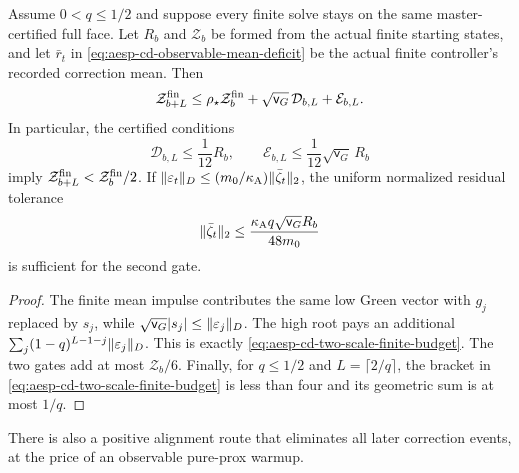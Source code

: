 \begin{corollary}
\label{cor:aesp-cd-finite-two-scale-window}
Assume $0<q\leq1/2$ and suppose every finite solve stays on the same
master-certified full face.  Let $R_b$ and $\mathcal Z_b$ be formed from the
actual finite starting states, and let $\bar r_t$ in
\cref{eq:aesp-cd-observable-mean-deficit} be the actual finite controller's
recorded correction mean.  Then
\begin{equation*}
 \mathcal Z_{b+L}^{\rm fin}
 \leq\rho_\star\mathcal Z_b^{\rm fin}
 +\sqrt{\mathsf v_G}\,\mathcal D_{b,L}
 +\mathcal E_{b,L}.
\end{equation*}
In particular, the certified conditions
\begin{equation}
 \mathcal D_{b,L}\leq\frac1{12}R_b,
 \qquad
 \mathcal E_{b,L}\leq\frac1{12}\sqrt{\mathsf v_G}\,R_b
 \label{eq:aesp-cd-finite-two-scale-gate}
\end{equation}
imply $\mathcal Z_{b+L}^{\rm fin}<\mathcal Z_b^{\rm fin}/2$.
If $\lVert\varepsilon_t\rVert_D\leq(m_0/\kappa_{\mathrm A})
\lVert\bar\zeta_t\rVert_2$, the uniform normalized residual tolerance
\begin{equation*}
 \lVert\bar\zeta_t\rVert_2
 \leq\frac{\kappa_{\mathrm A}q\sqrt{\mathsf v_G}R_b}{48m_0}
\end{equation*}
is sufficient for the second gate.
\end{corollary}

\begin{proof}
The finite mean impulse contributes the same low Green vector with $g_j$
replaced by $s_j$, while
$\sqrt{\mathsf v_G}|s_j|\leq\lVert\varepsilon_j\rVert_D$.
The high root pays an additional
$\sum_j(1-q)^{L-1-j}\lVert\varepsilon_j\rVert_D$.
This is exactly \cref{eq:aesp-cd-two-scale-finite-budget}.  The two gates add
at most $\mathcal Z_b/6$.  Finally, for $q\leq1/2$ and
$L=\lceil2/q\rceil$, the bracket in
\cref{eq:aesp-cd-two-scale-finite-budget} is less than four and its geometric
sum is at most $1/q$.
\end{proof}

There is also a positive alignment route that eliminates all later correction
events, at the price of an observable pure-prox warmup.

